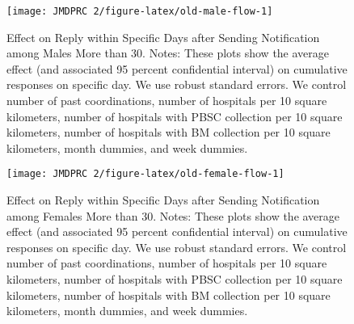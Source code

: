 \documentclass[
  11pt,
  a4paper
]{article}
\begin{document}
\begin{figure}[t]
\texttt{[image: JMDPRC~2/figure-latex/old-male-flow-1]} \caption{Effect on Reply within Specific Days after Sending Notification among Males More than 30. Notes: These plots show the average effect (and associated 95 percent confidential interval) on cumulative responses on specific day. We use robust standard errors. We control number of past coordinations, number of hospitals per 10 square kilometers, number of hospitals with PBSC collection per 10 square kilometers, number of hospitals with BM collection per 10 square kilometers, month dummies, and week dummies.}\label{fig:old-male-flow}
\end{figure}

\begin{figure}[t]
\texttt{[image: JMDPRC~2/figure-latex/old-female-flow-1]} \caption{Effect on Reply within Specific Days after Sending Notification among Females More than 30. Notes: These plots show the average effect (and associated 95 percent confidential interval) on cumulative responses on specific day. We use robust standard errors. We control number of past coordinations, number of hospitals per 10 square kilometers, number of hospitals with PBSC collection per 10 square kilometers, number of hospitals with BM collection per 10 square kilometers, month dummies, and week dummies.}\label{fig:old-female-flow}
\end{figure}
\end{document}
